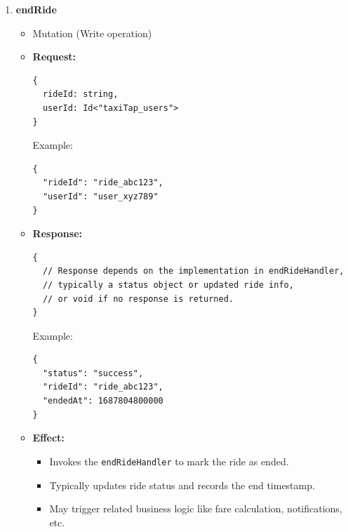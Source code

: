 \documentclass[a4paper,12pt]{article}
\begin{document}
\begin{enumerate}
\item \textbf{endRide}
  \begin{itemize}
    \item Mutation (Write operation)
    \item \textbf{Request:}
    \begin{verbatim}
{
  rideId: string,
  userId: Id<"taxiTap_users">
}
    \end{verbatim}
    Example:
    \begin{verbatim}
{
  "rideId": "ride_abc123",
  "userId": "user_xyz789"
}
    \end{verbatim}
    \item \textbf{Response:}
    \begin{verbatim}
{
  // Response depends on the implementation in endRideHandler,
  // typically a status object or updated ride info,
  // or void if no response is returned.
}
    \end{verbatim}
    Example:
    \begin{verbatim}
{
  "status": "success",
  "rideId": "ride_abc123",
  "endedAt": 1687804800000
}
    \end{verbatim}
    \item \textbf{Effect:}
    \begin{itemize}
      \item Invokes the \texttt{endRideHandler} to mark the ride as ended.
      \item Typically updates ride status and records the end timestamp.
      \item May trigger related business logic like fare calculation, notifications, etc.
    \end{itemize}
  \end{itemize}


\end{enumerate}
\end{document}
